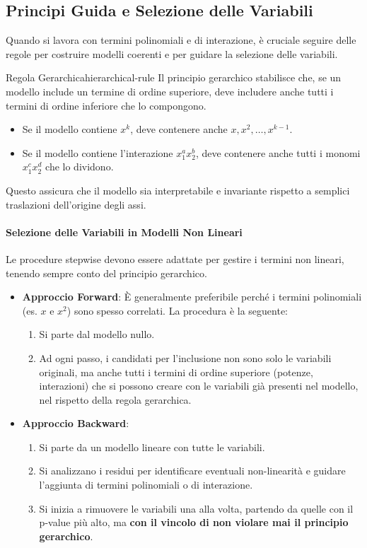 \subsection{Principi Guida e Selezione delle Variabili}

Quando si lavora con termini polinomiali e di interazione, è cruciale seguire
delle regole per costruire modelli coerenti e per guidare la selezione delle
variabili.

\begin{nota}{Regola Gerarchica}{hierarchical-rule}
Il principio gerarchico stabilisce che, se un modello include un termine di
ordine superiore, deve includere anche tutti i termini di ordine inferiore che
lo compongono.
\begin{itemize}
    \item Se il modello contiene \(x^k\), deve contenere anche \(x, x^2, \dots,
    x^{k-1}\).
\item Se il modello contiene l'interazione \(x_1^a x_2^b\), deve contenere anche
    tutti i monomi \(x_1^cx_2^d\) che lo dividono.
\end{itemize}
Questo assicura che il modello sia interpretabile e invariante rispetto a
semplici traslazioni dell'origine degli assi.
\end{nota}

\paragraph{Selezione delle Variabili in Modelli Non Lineari}
Le procedure stepwise devono essere adattate per gestire i termini non lineari,
tenendo sempre conto del principio gerarchico.
\begin{itemize}
    \item \textbf{Approccio Forward}: È generalmente preferibile perché i
    termini polinomiali (es. \(x\) e \(x^2\)) sono spesso correlati. La
    procedura è la seguente:
    \begin{enumerate}
        \item Si parte dal modello nullo.
        \item Ad ogni passo, i candidati per l'inclusione non sono solo le
        variabili originali, ma anche tutti i termini di ordine superiore
        (potenze, interazioni) che si possono creare con le variabili già
        presenti nel modello, nel rispetto della regola gerarchica.
    \end{enumerate}
    \item \textbf{Approccio Backward}:
    \begin{enumerate}
        \item Si parte da un modello lineare con tutte le variabili.
        \item Si analizzano i residui per identificare eventuali non-linearità
        e guidare l'aggiunta di termini polinomiali o di interazione.
        \item Si inizia a rimuovere le variabili una alla volta, partendo da
        quelle con il p-value più alto, ma \textbf{con il vincolo di non
        violare mai il principio gerarchico}.
    \end{enumerate}
\end{itemize}

